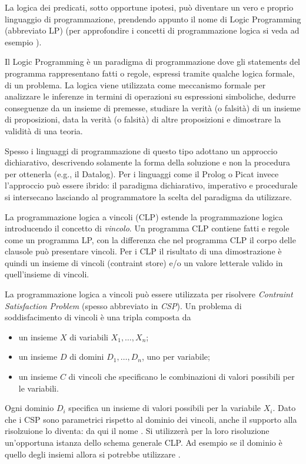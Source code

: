 \documentclass[12pt,a4paper,openright]{book} %
\begin{document}
La logica dei predicati, sotto opportune ipotesi, può diventare un
vero e proprio linguaggio di programmazione, prendendo appunto il nome
di Logic Programming (abbreviato LP) (per approfondire i concetti di
programmazione logica si veda ad esempio \cite{Console97}).

Il Logic Programming è un paradigma di programmazione dove gli
statements del programma rappresentano fatti o regole, espressi
tramite qualche logica formale, di un problema. La logica viene
utilizzata come meccanismo formale per analizzare le inferenze in
termini di operazioni su espressioni simboliche, dedurre conseguenze
da un insieme di premesse, studiare la verità (o falsità) di un
insieme di proposizioni, data la verità (o falsità) di altre
proposizioni e dimostrare la validità di una teoria.

Spesso i linguaggi di programmazione di questo tipo adottano un
approccio dichiarativo, descrivendo solamente la forma della soluzione
e non la procedura per ottenerla (e.g., il Datalog). Per i linguaggi
come il Prolog o Picat invece l'approccio può essere ibrido: il
paradigma dichiarativo, imperativo e procedurale si intersecano
lasciando al programmatore la scelta del paradigma da utilizzare.

La programmazione logica a vincoli (CLP) estende la programmazione
logica introducendo il concetto di \emph{vincolo}. Un programma CLP
contiene fatti e regole come un programma LP, con la differenza che
nel programma CLP il corpo delle clausole può presentare vincoli. Per
i CLP il risultato di una dimostrazione è quindi un insieme di vincoli
(contraint store) e/o un valore letterale valido in quell'insieme di
vincoli.

La programmazione logica a vincoli può essere utilizzata per risolvere
\emph{Contraint Satisfaction Problem} (spesso abbreviato in
\emph{CSP}). Un problema di soddisfacimento di vincoli è una tripla
composta da
\begin{itemize}
	\item un insieme $X$ di variabili ${X_1, \ldots, X_n}$;
	\item un insieme $D$ di domini ${D_1, \ldots, D_n}$, uno per
          variabile;
	\item un insieme $C$ di vincoli che specificano le
          combinazioni di valori possibili per le variabili.
\end{itemize}

Ogni dominio $D_i$ specifica un insieme di valori possibili per la
variabile $X_i$. Dato che i CSP sono parametrici rispetto al dominio
dei vincoli, anche il supporto alla risolzuione lo diventa: da qui il
nome \clpset{}. Si utilizzerà per la loro risoluzione un’opportuna
istanza dello schema generale CLP. Ad esempio se il dominio è quello
degli insiemi allora si potrebbe utilizzare \clpset{}.
\end{document}
